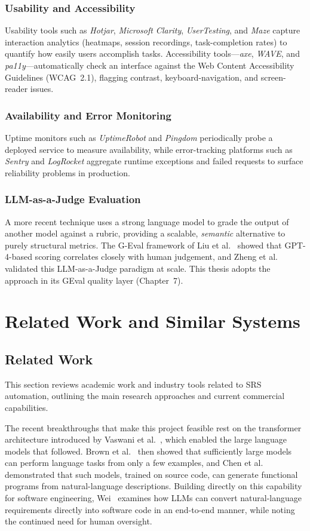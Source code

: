 \documentclass[12pt,a4paper,oneside]{report}
\begin{document}
\subsection{Usability and Accessibility}
Usability tools such as \emph{Hotjar}, \emph{Microsoft Clarity}, \emph{UserTesting}, and \emph{Maze} capture interaction analytics (heatmaps, session recordings, task-completion rates) to quantify how easily users accomplish tasks. Accessibility tools---\emph{axe}, \emph{WAVE}, and \emph{pa11y}---automatically check an interface against the Web Content Accessibility Guidelines (WCAG~2.1), flagging contrast, keyboard-navigation, and screen-reader issues.

\subsection{Availability and Error Monitoring}
Uptime monitors such as \emph{UptimeRobot} and \emph{Pingdom} periodically probe a deployed service to measure availability, while error-tracking platforms such as \emph{Sentry} and \emph{LogRocket} aggregate runtime exceptions and failed requests to surface reliability problems in production.

\subsection{LLM-as-a-Judge Evaluation}
A more recent technique uses a strong language model to grade the output of another model against a rubric, providing a scalable, \emph{semantic} alternative to purely structural metrics. The G-Eval framework of Liu et al.~\cite{ref16} showed that GPT-4-based scoring correlates closely with human judgement, and Zheng et al.~\cite{ref17} validated this LLM-as-a-Judge paradigm at scale. This thesis adopts the approach in its GEval quality layer (Chapter~7).

\chapter{Related Work and Similar Systems}
\section{Related Work}
This section reviews academic work and industry tools related to SRS automation, outlining the main research approaches and current commercial capabilities.

The recent breakthroughs that make this project feasible rest on the transformer architecture introduced by Vaswani et al.~\cite{ref13}, which enabled the large language models that followed. Brown et al.~\cite{ref14} then showed that sufficiently large models can perform language tasks from only a few examples, and Chen et al.~\cite{ref15} demonstrated that such models, trained on source code, can generate functional programs from natural-language descriptions. Building directly on this capability for software engineering, Wei~\cite{ref3} examines how LLMs can convert natural-language requirements directly into software code in an end-to-end manner, while noting the continued need for human oversight.
\end{document}
